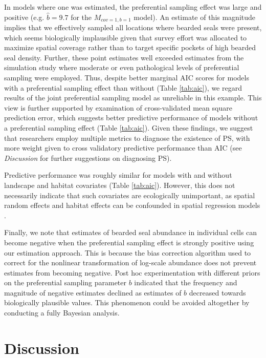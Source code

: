 \documentclass[times,mee,doublespace,]{besauth2}
\begin{document}
In models where one was estimated, the preferential sampling effect was large and positive (e.g. $\hat{b}=9.7$ for the $M_{cov=1,b=1}$ model).  An estimate of this magnitude implies that we effectively sampled all locations where bearded seals were present, which seems biologically implausible given that survey effort was allocated to maximize spatial coverage rather than to target specific pockets of high bearded seal density.  Further, these point estimates well exceeded estimates from the simulation study where moderate or even pathological levels of preferential sampling were employed.  Thus, despite better marginal AIC scores for models with a preferential sampling effect than without (Table \ref{tab:aic}), we regard results of the joint preferential sampling model as unreliable in this example.  This view is further supported by examination of cross-validated mean square prediction error, which suggests better predictive performance of models without a preferential sampling effect (Table \ref{tab:aic}).  Given these findings, we suggest that researchers employ multiple metrics to diagnose the existence of PS, with more weight given to cross validatory predictive performance than AIC (see \textit{Discussion} for further suggestions on diagnosing PS).

Predictive performance was roughly similar for models with and without landscape and habitat covariates (Table \ref{tab:aic}).  However, this does not necessarily indicate that such covariates are ecologically unimportant, as spatial random effects and habitat effects can be confounded in spatial regression models \citep{HodgesReich2010}.

Finally, we note that estimates of bearded seal abundance in individual cells can become negative when the preferential sampling effect is strongly positive using our estimation approach.  This is because the bias correction algorithm \citep{TierneyEtAl1989,ThorsonKristensen2016} used to correct for the nonlinear transformation of log-scale abundance does not prevent estimates from becoming negative.  Post hoc experimentation with different priors on the preferential sampling parameter $b$ indicated that the frequency and magnitude of negative estimates declined as estimates of $b$ decreased towards biologically plausible values.  This phenomenon could be avoided altogether by conducting a fully Bayesian analysis.


\section{Discussion}
\end{document}
